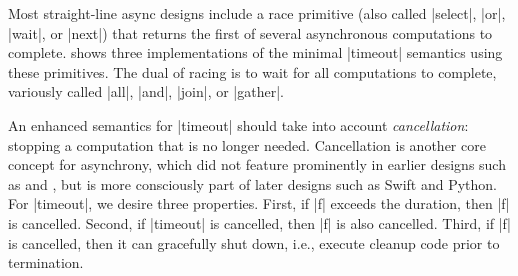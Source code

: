 Most straight-line async designs include a race primitive (also called \code|select|, \code|or|, \code|wait|, or \code|next|) that returns the first of several asynchronous computations to complete.  shows three implementations of the minimal \code|timeout| semantics using these primitives. The dual of racing is to wait for all computations to complete, variously called \code|all|, \code|and|, \code|join|, or \code|gather|.

An enhanced semantics for \code|timeout| should take into account \emph{cancellation}: stopping a computation that is no longer needed. Cancellation is another core concept for asynchrony, which did not feature prominently in earlier designs such as \Js and \CSharp, but is more consciously part of later designs such as Swift and Python. For \code|timeout|, we desire three properties. First, if \code|f| exceeds the duration, then \code|f| is cancelled. Second, if \code|timeout| is cancelled, then \code|f| is also cancelled. Third, if \code|f| is cancelled, then it can gracefully shut down, i.e., execute cleanup code prior to termination.

